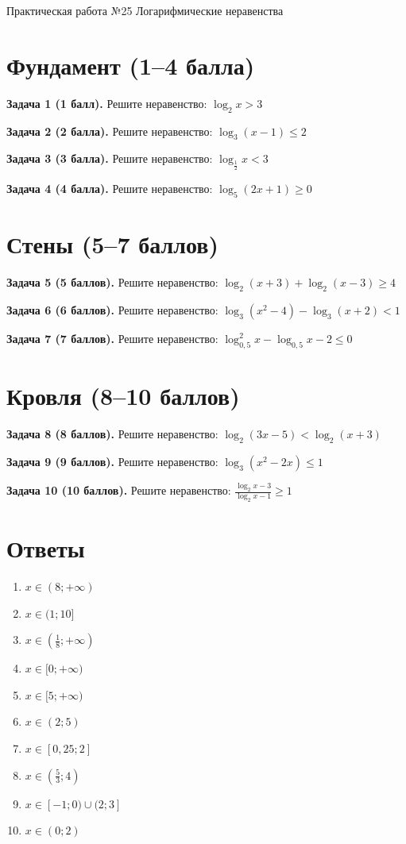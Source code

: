 \documentclass{umk-matematika}
\begin{document}
\maketitlepage
    {Практическая работа №25}
    {Логарифмические неравенства}
    {}

\section{Фундамент (1--4 балла)}

\textbf{Задача 1 (1 балл).} Решите неравенство: $\log_{2} x > 3$

\textbf{Задача 2 (2 балла).} Решите неравенство: $\log_{3} (x - 1) \le 2$

\textbf{Задача 3 (3 балла).} Решите неравенство: $\log_{\frac{1}{2}} x < 3$

\textbf{Задача 4 (4 балла).} Решите неравенство: $\log_{5} (2x + 1) \ge 0$

\section{Стены (5--7 баллов)}

\textbf{Задача 5 (5 баллов).} Решите неравенство: $\log_{2} (x + 3) + \log_{2} (x - 3) \ge 4$

\textbf{Задача 6 (6 баллов).} Решите неравенство: $\log_{3} (x^2 - 4) - \log_{3} (x + 2) < 1$

\textbf{Задача 7 (7 баллов).} Решите неравенство: $\log_{0{,}5}^{2} x - \log_{0{,}5} x - 2 \le 0$

\section{Кровля (8--10 баллов)}

\textbf{Задача 8 (8 баллов).} Решите неравенство: $\log_{2} (3x - 5) < \log_{2} (x + 3)$

\textbf{Задача 9 (9 баллов).} Решите неравенство: $\log_{3} (x^2 - 2x) \le 1$

\textbf{Задача 10 (10 баллов).} Решите неравенство: $\frac{\log_{2} x - 3}{\log_{2} x - 1} \ge 1$

\newpage
\section*{Ответы}

\begin{enumerate}
  \item $x \in (8; +\infty)$
  \item $x \in (1; 10]$
  \item $x \in \left(\frac{1}{8}; +\infty\right)$
  \item $x \in [0; +\infty)$
  \item $x \in [5; +\infty)$
  \item $x \in (2; 5)$
  \item $x \in [0{,}25; 2]$
  \item $x \in \left(\frac{5}{3}; 4\right)$
  \item $x \in [-1; 0) \cup (2; 3]$
  \item $x \in (0; 2)$
\end{enumerate}
\end{document}
